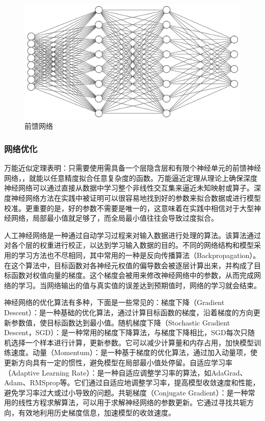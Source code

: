 \begin{figure}[htbp]
    \centering
    \includegraphics[width=0.8\linewidth]{image/NN}
    \caption{前馈网络}
    \label{img:FNN}
\end{figure} 

\subsubsection{网络优化}

万能近似定理表明：只需要使用需具备一个层隐含层和有限个神经单元的前馈神经网络，，就能以任意精度拟合任意复杂度的函数。万能逼近定理从理论上确保深度神经网络可以通过直接从数据中学习整个非线性交互集来逼近未知映射或算子。深度神经网络方法在实践中被证明可以很容易地找到好的参数来拟合数据或进行模型校准。更重要的是，好的参数不需要是唯一的，这意味着在实践中相信对于大型神经网络，局部最小值就足够了，而全局最小值往往会导致过度拟合。

人工神经网络是一种通过自动学习过程来对输入数据进行处理的算法。该算法通过对各个层的权重进行校正，以达到学习输入数据的目的。不同的网络结构和模型采用的学习方法也不尽相同，其中常用的一种是反向传播算法（Backpropagation）。在这个算法中，目标函数对各神经元权值的偏导数会被逐层计算出来，并构成了目标函数对权值向量的梯度。这个梯度会被用来修改神经网络中的参数，从而完成网络的学习。当网络输出的值与真实值的误差达到预期值时，网络的学习就会结束。

神经网络的优化算法有多种，下面是一些常见的：梯度下降（Gradient Descent）：是一种基础的优化算法，通过计算目标函数的梯度，沿着梯度的方向更新参数值，使目标函数达到最小值。随机梯度下降（Stochastic Gradient Descent，SGD）：是一种常用的梯度下降算法，与梯度下降相比，SGD每次只随机选择一个样本进行计算，更新参数。它可以减少计算量和内存占用，加快模型训练速度。动量（Momentum）：是一种基于梯度的优化算法，通过加入动量项，使更新方向具有一定的惯性，避免模型在局部最小值处停留。自适应学习率（Adaptive Learning Rate）：是一种自适应调整学习率的算法，如AdaGrad、Adam、RMSprop等。它们通过自适应地调整学习率，提高模型收敛速度和性能，避免学习率过大或过小导致的问题。共轭梯度（Conjugate Gradient）：是一种常用的线性方程求解算法，可以用于求解神经网络的参数更新。它通过寻找共轭方向，有效地利用历史梯度信息，加速模型的收敛速度。

